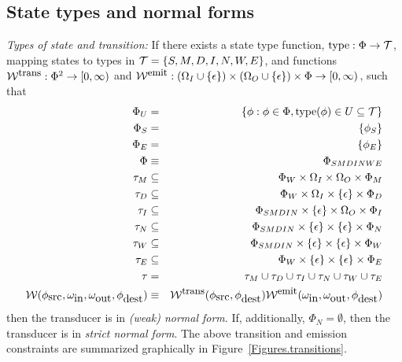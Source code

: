 \documentclass{article}
\newcommand{\seclabel}[1]{\label{sec.#1}}
\newcommand{\figref}[1]{Figure~\ref{Figures.#1}}
\newcommand\gappedalphabet[1]{(\Omega_{#1} \cup \{\epsilon\})}
\newcommand\gappedpair[2]{\gappedalphabet{#1} \times \gappedalphabet{#2}}
\newcommand\States{\Phi}
\newcommand\Transitions{\tau}
\newcommand\startstate{\phi_S}
\newcommand\laststate{\phi_E}
\newcommand\weight{{\cal W}}
\newcommand\weightfunof[1]{\weight_{#1}}
\newcommand\transweightfun[1]{\weightfunof{#1}^{\mbox{\small trans}}}
\newcommand\emitweightfun[1]{\weightfunof{#1}^{\mbox{\small emit}}}
\newcommand\statesoftype[1]{\States_{#1}}
\newcommand\statetype{\mbox{type}}
\begin{document}
\subsection{State types and normal forms}
\seclabel{StateTypes}
{\em Types of state and transition:}
If there exists a state type function, $\statetype:\States \to {\cal T}$, mapping states to types in ${\cal T} = \{S,M,D,I,N,W,E\}$,
and functions $\transweightfun{}: \States^2 \to [0,\infty)$ and $\emitweightfun{}: \gappedpair{I}{O} \times \States \to [0,\infty)$,
such that
\begin{eqnarray*}
\States_U & = & \{ \phi: \phi\in\States, \statetype(\phi) \in U \subseteq {\cal T} \} \\
\statesoftype{S} & = & \{ \startstate \} \\
\statesoftype{E} & = & \{ \laststate \} \\
\States & \equiv & \statesoftype{SMDINWE} \\   
\Transitions_M & \subseteq & \statesoftype{W} \times \Omega_I \times \Omega_O \times \statesoftype{M} \\
\Transitions_D & \subseteq & \statesoftype{W} \times \Omega_I \times \{\epsilon\} \times \statesoftype{D} \\
\Transitions_I & \subseteq & \statesoftype{SMDIN} \times \{\epsilon\} \times \Omega_O \times \statesoftype{I} \\
\Transitions_N & \subseteq & \statesoftype{SMDIN} \times \{\epsilon\} \times \{\epsilon\} \times \statesoftype{N} \\
\Transitions_W & \subseteq & \statesoftype{SMDIN} \times \{\epsilon\} \times \{\epsilon\} \times \statesoftype{W} \\
\Transitions_E & \subseteq & \statesoftype{W} \times \{\epsilon\} \times \{\epsilon\} \times \statesoftype{E} \\
\Transitions & = & \Transitions_M \cup \Transitions_D \cup \Transitions_I \cup \Transitions_N \cup \Transitions_W \cup \Transitions_E \\
\weight(\phi_{\mbox{src}},\omega_{\mbox{in}},\omega_{\mbox{out}},\phi_{\mbox{dest}}) & \equiv & \transweightfun{}(\phi_{\mbox{src}},\phi_{\mbox{dest}}) \emitweightfun{}(\omega_{\mbox{in}},\omega_{\mbox{out}},\phi_{\mbox{dest}})
\end{eqnarray*}
then the transducer is in {\em (weak) normal form}.
If, additionally, $\statesoftype{N} = \emptyset$, then the transducer is in {\em strict normal form}.
The above transition and emission constraints are summarized graphically in \figref{transitions}. 
\end{document}
